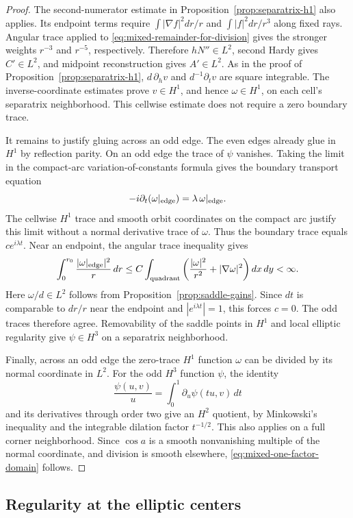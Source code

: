 \documentclass[reqno,11pt]{amsart}
\numberwithin{equation}{section}
\theoremstyle{remark}
\begin{document}
\begin{proof}
The second-numerator estimate in
Proposition~\ref{prop:separatrix-h1} also applies.  Its endpoint
terms require $\int|\nabla f|^2dr/r$ and
$\int|f|^2dr/r^3$ along fixed rays.  Angular trace applied to
\eqref{eq:mixed-remainder-for-division} gives the stronger
weights $r^{-3}$ and $r^{-5}$, respectively.  Therefore
$hN''\in L^2$, second Hardy gives $C'\in L^2$, and midpoint
reconstruction gives $A'\in L^2$.
As in the proof of Proposition~\ref{prop:separatrix-h1},
$d\,\partial_hv$ and $d^{-1}\partial_tv$ are square integrable.
The inverse-coordinate estimates prove $v\in H^1$, and hence
$\omega\in H^1$, on each cell's separatrix neighborhood.
This cellwise estimate does not require a zero boundary trace.

It remains to justify gluing across an odd edge.  The even edges
already glue in $H^1$ by reflection parity.
On an odd edge the trace of $\psi$ vanishes.  Taking the limit
in the compact-arc variation-of-constants formula gives the
boundary transport equation
\[
 -i\partial_t(\omega|_{\rm edge})
          =\lambda\,\omega|_{\rm edge}.
\]
The cellwise $H^1$ trace and smooth orbit coordinates on the compact
arc justify this limit without a normal derivative trace of $\omega$.
Thus the boundary trace equals $c e^{i\lambda t}$.
Near an endpoint, the angular trace inequality gives
\[
 \int_0^{r_0}\frac{|\omega|_{\rm edge}|^2}{r}\,dr
 \leq C\int_{\rm quadrant}
       \left(\frac{|\omega|^2}{r^2}+|\nabla\omega|^2\right)dx\,dy
 <\infty.
\]
Here $\omega/d\in L^2$ follows from
Proposition~\ref{prop:saddle-gains}.
Since $dt$ is comparable to $dr/r$ near the endpoint and
$|e^{i\lambda t}|=1$, this forces $c=0$.
The odd traces therefore agree. Removability of the saddle points in
$H^1$ and local elliptic regularity give $\psi\in H^3$ on a
separatrix neighborhood.

Finally, across an odd edge the zero-trace $H^1$ function
$\omega$ can be divided by its normal coordinate in $L^2$.
For the odd $H^3$ function $\psi$, the identity
\[
 \frac{\psi(u,v)}u=\int_0^1\partial_u\psi(tu,v)\,dt
\]
and its derivatives through order two give an $H^2$ quotient,
by Minkowski's inequality and the integrable dilation factor
$t^{-1/2}$. This also applies on a full corner neighborhood. Since
$\cos a$ is a smooth nonvanishing multiple of the normal coordinate,
and division is smooth elsewhere, \eqref{eq:mixed-one-factor-domain}
follows.
\end{proof}

\subsection{Regularity at the elliptic centers}
\label{sec:center-regularity}
\end{document}
